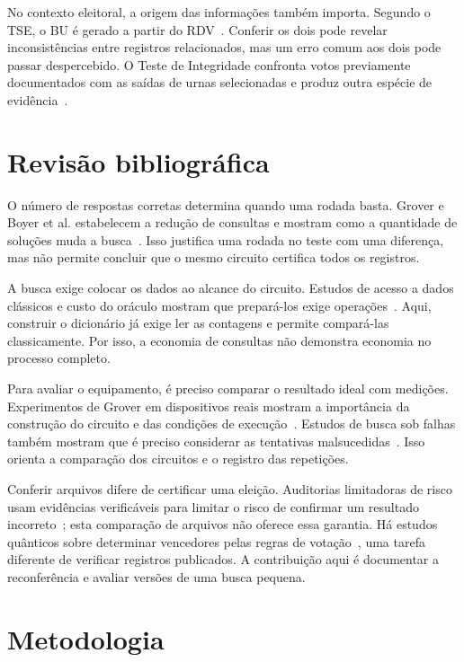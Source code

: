 \documentclass[conference]{IEEEtran}
\begin{document}
No contexto eleitoral, a origem das informações também importa. Segundo o TSE, o BU é gerado a partir do RDV~\cite{tseVotacaoSegura}. Conferir os dois pode revelar inconsistências entre registros relacionados, mas um erro comum aos dois pode passar despercebido. O Teste de Integridade confronta votos previamente documentados com as saídas de urnas selecionadas e produz outra espécie de evidência~\cite{tseAuditoria,tseIntegridade2026}.

\section{Revisão bibliográfica}
O número de respostas corretas determina quando uma rodada basta. Grover e Boyer et al. estabelecem a redução de consultas e mostram como a quantidade de soluções muda a busca~\cite{grover1996,boyer1998}. Isso justifica uma rodada no teste com uma diferença, mas não permite concluir que o mesmo circuito certifica todos os registros.

A busca exige colocar os dados ao alcance do circuito. Estudos de acesso a dados clássicos e custo do oráculo mostram que prepará-los exige operações~\cite{park2019,stoudenmire2024}. Aqui, construir o dicionário já exige ler as contagens e permite compará-las classicamente. Por isso, a economia de consultas não demonstra economia no processo completo.

Para avaliar o equipamento, é preciso comparar o resultado ideal com medições. Experimentos de Grover em dispositivos reais mostram a importância da construção do circuito e das condições de execução~\cite{pokharel2024,abughanem2025}. Estudos de busca sob falhas também mostram que é preciso considerar as tentativas malsucedidas~\cite{vrana2014}. Isso orienta a comparação dos circuitos e o registro das repetições.

Conferir arquivos difere de certificar uma eleição. Auditorias limitadoras de risco usam evidências verificáveis para limitar o risco de confirmar um resultado incorreto~\cite{lindeman2012}; esta comparação de arquivos não oferece essa garantia. Há estudos quânticos sobre determinar vencedores pelas regras de votação~\cite{liu2023}, uma tarefa diferente de verificar registros publicados. A contribuição aqui é documentar a reconferência e avaliar versões de uma busca pequena.

\section{Metodologia}
\end{document}
